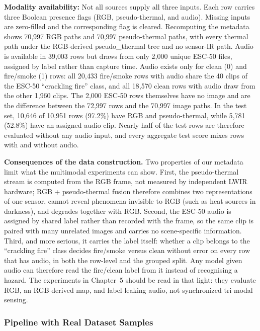 \documentclass[journal]{IEEEtran}
\begin{document}
\textbf{Modality availability:} Not all sources supply all three inputs. Each row carries three Boolean presence flags (RGB, pseudo-thermal, and audio). Missing inputs are zero-filled and the corresponding flag is cleared. Recomputing the metadata shows 70{,}997 RGB paths and 70{,}997 pseudo-thermal paths, with every thermal path under the RGB-derived pseudo\_thermal tree and no sensor-IR path. Audio is available in 39{,}003 rows but draws from only 2{,}000 unique ESC-50 files, assigned by label rather than capture time. Audio exists only for clean (0) and fire/smoke (1) rows: all 20{,}433 fire/smoke rows with audio share the 40 clips of the ESC-50 ``crackling fire'' class, and all 18{,}570 clean rows with audio draw from the other 1{,}960 clips. The 2{,}000 ESC-50 rows themselves have no image and are the difference between the 72{,}997 rows and the 70{,}997 image paths. In the test set, 10{,}646 of 10{,}951 rows (97.2\%) have RGB and pseudo-thermal, while 5{,}781 (52.8\%) have an assigned audio clip. Nearly half of the test rows are therefore evaluated without any audio input, and every aggregate test score mixes rows with and without audio.

\textbf{Consequences of the data construction.} Two properties of our metadata limit what the multimodal experiments can show. First, the pseudo-thermal stream is computed from the RGB frame, not measured by independent LWIR hardware; RGB + pseudo-thermal fusion therefore combines two representations of one sensor, cannot reveal phenomena invisible to RGB (such as heat sources in darkness), and degrades together with RGB. Second, the ESC-50 audio is assigned by shared label rather than recorded with the frame, so the same clip is paired with many unrelated images and carries no scene-specific information. Third, and more serious, it carries the label itself: whether a clip belongs to the ``crackling fire'' class decides fire/smoke versus clean without error on every row that has audio, in both the row-level and the grouped split. Any model given audio can therefore read the fire/clean label from it instead of recognising a hazard. The experiments in Chapter~5 should be read in that light: they evaluate RGB, an RGB-derived map, and label-leaking audio, not synchronized tri-modal sensing.

\subsubsection{Pipeline with Real Dataset Samples}
\end{document}
